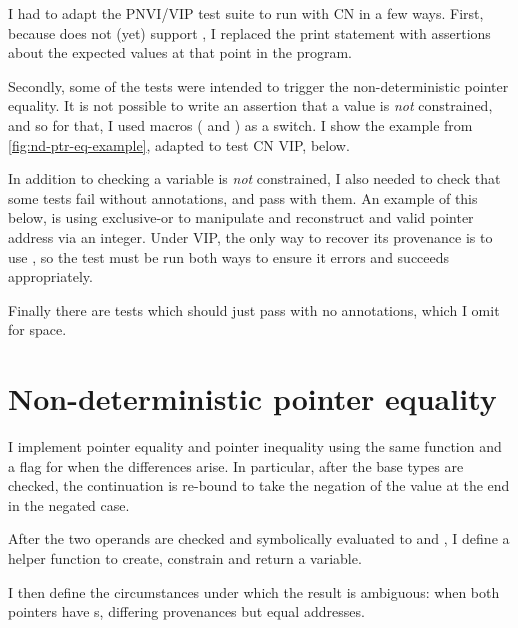 I had to adapt the PNVI/VIP test suite to run with CN in a few ways. First,
because  does not (yet) support , I replaced the print
statement with assertions about the expected values at that point in the
program.

Secondly, some of the tests were intended to trigger the non-deterministic
pointer equality. It is not possible to write an assertion that a value
is \emph{not} constrained, and so for that, I used macros
( and ) as a switch. I show the
example from \cref{fig:nd-ptr-eq-example}, adapted to test CN VIP, below.


In addition to checking a variable is \emph{not} constrained, I also needed to
check that some tests fail without  annotations, and
pass with them. An example of this below, is using exclusive-or to manipulate
and reconstruct and valid pointer address via an integer. Under VIP, the only
way to recover its provenance is to use , so the test
must be run both ways to ensure it errors and succeeds appropriately.


Finally there are tests which should just pass with no annotations, which I
omit for space.

\section{Non-deterministic pointer equality}

I implement pointer equality and pointer inequality using the same function and
a flag for when the differences arise. In particular, after the base types are
checked, the continuation is re-bound to take the negation of the value at the
end in the negated case.


After the two operands are checked and symbolically evaluated to
 and , I define a helper function to create,
constrain and return a variable.


I then define the circumstances under which the result is ambiguous: when both
pointers have s, differing provenances but equal addresses.

